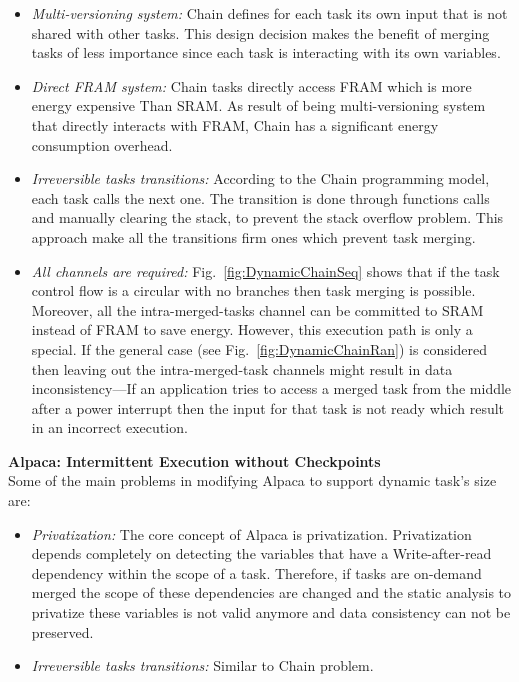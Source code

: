 \documentclass[pageno]{jpaper}
\begin{document}
\begin{itemize}
	\item \emph{Multi-versioning system:} Chain defines for each task its own input that is not shared with other tasks. This design decision makes the benefit of merging tasks of less importance since each task is interacting with its own variables. 
	\item \emph{Direct FRAM system:} Chain tasks directly access FRAM which is more energy expensive Than SRAM. As result of being multi-versioning system that directly interacts with FRAM, Chain has a significant energy consumption overhead. 
	\item \emph{Irreversible tasks transitions:} According to the Chain programming model, each task calls the next one. The transition is done through functions calls and manually clearing the stack, to prevent the stack overflow problem. This approach make all the transitions firm ones which prevent task merging.
	\item \emph{All channels are required:} Fig.~\ref{fig:DynamicChainSeq} shows that if the task control flow is a circular with no branches then task merging is possible. Moreover, all the intra-merged-tasks channel can be committed to SRAM instead of FRAM to save energy. However, this execution path is only a special. If the general case (see Fig.~\ref{fig:DynamicChainRan}) is considered then leaving out the intra-merged-task channels might result in data inconsistency---If an application tries to access a merged task from the middle after a power interrupt then the input for that task is not ready which result in an incorrect execution. 


\end{itemize}


\noindent\textbf{Alpaca: Intermittent Execution without Checkpoints} \\
Some of the main problems in modifying Alpaca to support dynamic task's size are:

\begin{itemize}
	\item \emph{Privatization:} The core concept of Alpaca is privatization. Privatization depends completely on detecting the variables that have a Write-after-read dependency within the scope of a task. Therefore, if tasks are on-demand merged the scope of these dependencies are changed and the static analysis to privatize these variables is not valid anymore and data consistency can not be preserved.  

	\item \emph{Irreversible tasks transitions:} Similar to Chain problem. 

\end{itemize}
\end{document}
